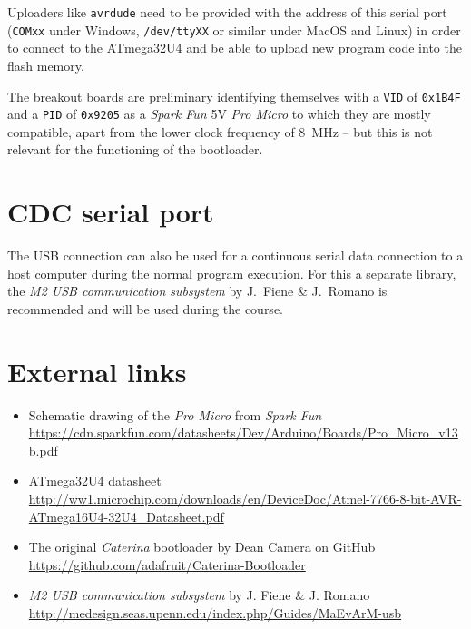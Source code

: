 \begin{multicols}{2}
  Uploaders like \lstinline!avrdude! need to be provided with the address of
  this serial port (\lstinline!COMxx! under Windows, \lstinline!/dev/ttyXX! or similar under
  MacOS and Linux) in order to connect to the ATmega32U4 and be able to upload new program code
  into the flash memory.

  The breakout boards are preliminary identifying themselves with a \lstinline!VID! of \lstinline!0x1B4F!
  and a \lstinline!PID! of \lstinline!0x9205! as a \emph{Spark Fun} 5V \emph{Pro Micro} to which
  they are mostly compatible,
  apart from the lower clock frequency of \SI{8}{\mega\hertz} -- but this is not relevant for the
  functioning of the bootloader.


\section{CDC serial port}
  The USB connection can also be used for a continuous serial data connection to a host computer
  during the normal program execution. For this a separate library, the \emph{M2 USB communication subsystem} by
  J.\ Fiene \& J.\ Romano is recommended and will be used during the course.
\end{multicols}

\section*{External links}
\begin{itemize}
  \item Schematic drawing of the \emph{Pro Micro} from \emph{Spark Fun}\\ \url{https://cdn.sparkfun.com/datasheets/Dev/Arduino/Boards/Pro_Micro_v13b.pdf}
  \item ATmega32U4 datasheet\\ \url{http://ww1.microchip.com/downloads/en/DeviceDoc/Atmel-7766-8-bit-AVR-ATmega16U4-32U4_Datasheet.pdf}
  \item The original \emph{Caterina} bootloader by Dean Camera on GitHub\\
      \url{https://github.com/adafruit/Caterina-Bootloader}
  \item \emph{M2 USB communication subsystem} by J. Fiene \& J. Romano\\
  \url{http://medesign.seas.upenn.edu/index.php/Guides/MaEvArM-usb}
\end{itemize}


